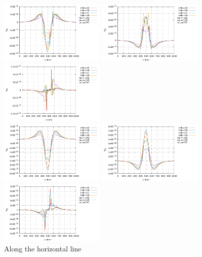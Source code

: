 \begin{center}
\includegraphics[width=5cm]{python_codes/fieldstone_26/results/case2a/horizontal_exx.pdf}
\includegraphics[width=5cm]{python_codes/fieldstone_26/results/case2a/horizontal_eyy.pdf}
\includegraphics[width=5cm]{python_codes/fieldstone_26/results/case2a/horizontal_exy.pdf}\\
\includegraphics[width=5cm]{python_codes/fieldstone_26/results/case2a/horizontal_exxn.pdf}
\includegraphics[width=5cm]{python_codes/fieldstone_26/results/case2a/horizontal_eyyn.pdf}
\includegraphics[width=5cm]{python_codes/fieldstone_26/results/case2a/horizontal_exyn.pdf}\\
{\captionfont Along the horizontal line}
\end{center}

